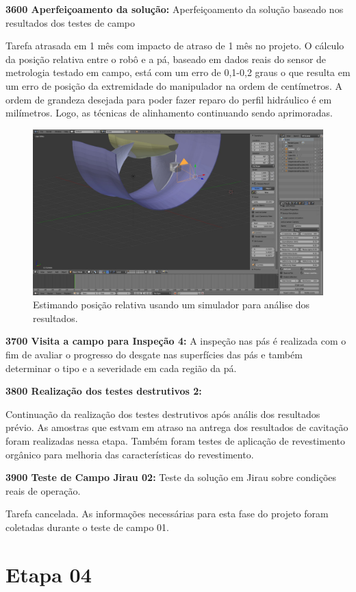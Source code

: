 \noindent
\textbf{3600 Aperfeiçoamento da solução:}
Aperfeiçoamento da solução baseado nos resultados dos testes de campo 

Tarefa atrasada em 1 mês com impacto de atraso de 1 mês no projeto. O cálculo da
posição relativa entre o robô e a pá, baseado em dados reais do sensor de
metrologia testado em campo, está com um erro de 0,1-0,2 graus o que resulta em
um erro de posição da extremidade do manipulador na ordem de centímetros. A
ordem de grandeza desejada para poder fazer reparo do perfil hidráulico é em
milímetros. Logo, as técnicas de alinhamento continuando sendo aprimoradas.

\begin{figure}\centering
\includegraphics[width=0.6\columnwidth]{figs/blensor_screen}
\caption{Estimando posição relativa usando um simulador para análise dos
resultados.}
\end{figure} 


\noindent
\textbf{3700  Visita a campo para Inspeção 4:}
A inspeção nas pás é realizada com o fim de avaliar o progresso do desgate nas superfícies das pás e também determinar o tipo e a severidade em cada região da pá. 

\noindent
\textbf{3800 Realização dos testes destrutivos 2:}

Continuação da realização dos testes destrutivos após anális dos resultados prévio. As amostras que estvam em atraso na antrega dos resultados de cavitação foram realizadas nessa etapa. Também foram testes de aplicação de revestimento orgânico para melhoria das características do revestimento.


\noindent
\textbf{3900 Teste de Campo Jirau 02:} Teste da solução  em Jirau sobre
condições reais de operação.

Tarefa cancelada. As informações necessárias para esta fase do
projeto foram coletadas durante o teste de campo 01. 

\section{Etapa 04} 

